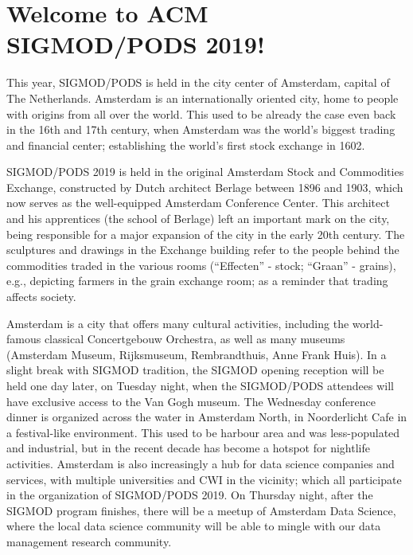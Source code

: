 
\section{Welcome to ACM SIGMOD/PODS 2019!}

This year, SIGMOD/PODS is held in the city center of Amsterdam, capital of The Netherlands. Amsterdam is an internationally oriented city, home to people with origins from all over the world. This used to be already the case even back in the 16th and 17th century, when Amsterdam was the world's biggest trading and financial center; establishing the world's first stock exchange in 1602.

SIGMOD/PODS 2019 is held in the original Amsterdam Stock and Commodities Exchange, constructed by Dutch architect Berlage between 1896 and 1903, which now serves as the well-equipped Amsterdam Conference Center. This architect and his apprentices (the school of Berlage) left an important mark on the city, being responsible for a major expansion of the city in the early 20th century. The sculptures and drawings in the Exchange building refer to the people behind the commodities traded in the various rooms (``Effecten'' - stock; ``Graan'' - grains), e.g., depicting farmers in the grain exchange room; as a reminder that trading affects society.

Amsterdam is a city that offers many cultural activities, including the world-famous classical Concertgebouw Orchestra, as well as many museums (Amsterdam Museum, Rijksmuseum, Rembrandthuis, Anne Frank Huis). In a slight break with SIGMOD tradition, the SIGMOD opening reception will be held one day later, on Tuesday night, when the SIGMOD/PODS attendees will have exclusive access to the Van Gogh museum. The Wednesday conference dinner is organized across the water in Amsterdam North, in Noorderlicht Cafe in a festival-like environment. This used to be harbour area and was less-populated and industrial, but in the recent decade has become a hotspot for nightlife activities. Amsterdam is also increasingly a hub for data science companies and services, with multiple universities and CWI in the vicinity; which all participate in the organization of SIGMOD/PODS 2019. On Thursday night, after the SIGMOD program finishes, there will be a meetup of Amsterdam Data Science, where the local data science community will be able to mingle with our data management research community.

